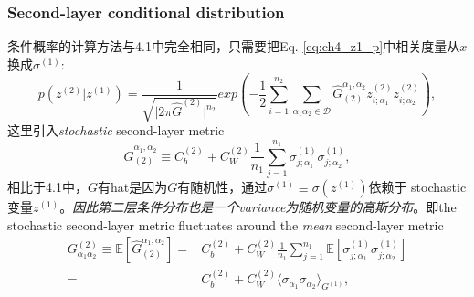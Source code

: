 \subsubsection{Second-layer conditional distribution}
条件概率的计算方法与4.1中完全相同，只需要把Eq. \ref{eq:ch4_z1_p}中相关度量从$x$换成$\sigma^{(1)}$:
\begin{equation}
    p\left(z^{(2)}\big| z^{(1)}\right) = \frac{1}{\sqrt{\big|2\pi \hat{G}^{(2)}\big|^{n_2}}}
    exp\left(-\frac{1}{2}\sum_{i=1}^{n_2}\sum_{\alpha_1\alpha_2\in\mathcal{D}}
    \hat{G}^{\alpha_1,\alpha_2}_{(2)}z_{i;\alpha_1}^{(2)}z_{i;\alpha_2}^{(2)}\right),
    \label{eq:ch4_z2_cond_p}
\end{equation}
这里引入\emph{stochastic} second-layer metric
\begin{equation}
    \hat{G}^{\alpha_1,\alpha_2}_{(2)} \equiv C_b^{(2)} + C_W^{(2)}\frac{1}{n_1}
    \sum_{j=1}^{n_1}\sigma_{j;\alpha_1}^{(1)}\sigma_{j;\alpha_2}^{(1)},
    \label{eq:ch4_2layer_metric}
\end{equation}
相比于4.1中，$G$有hat是因为$G$有随机性，通过$\sigma^{(1)}\equiv \sigma(z^{(1)})$依赖于
stochastic 变量$z^{(1)}$。\emph{因此第二层条件分布也是一个variance为随机变量的高斯分布}。即the stochastic
second-layer metric fluctuates around the \emph{mean} second-layer metric
\begin{equation}
    \begin{aligned}
    G_{\alpha_1\alpha_2}^{(2)} \equiv \mathbb{E}\left[\hat{G}^{\alpha_1,\alpha_2}_{(2)}\right]
    = & C_b^{(2)} + C_W^{(2)}\frac{1}{n_1}\sum_{j=1}^{n_1}\mathbb{E}\left[\sigma_{j;\alpha_1}^{(1)}
    \sigma_{j;\alpha_2}^{(1)}\right] \\
    = & C_b^{(2)} + C_W^{(2)}\langle\sigma_{\alpha_1}\sigma_{\alpha_2}\rangle_{G^{(1)}},
    \end{aligned}
    \label{eq:ch4_2fluc}
\end{equation}

